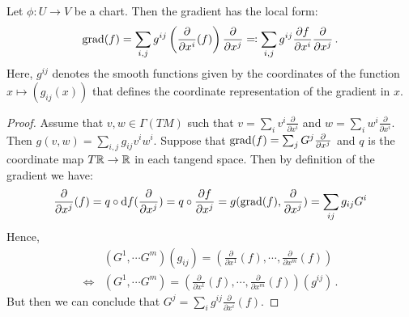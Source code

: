 \begin{lemma}
	Let $\phi:U\to V$ be a chart. Then the gradient has the local form:
	\begin{align*}
		\mathrm{grad}(f) =\sum_{i,j}g^{ij}  \left( \frac{\partial }{\partial x^i} (f) \right) \frac{\partial }{\partial x^j} \eqcolon \sum_{i,j}g^{ij} \frac{\partial f}{\partial x^i}  \frac{\partial }{\partial x^j} \, .
	\end{align*}
	Here, $g^{ij}$ denotes the smooth functions given by the coordinates of the function $x\mapsto (g_{ij}(x))$ that defines the coordinate representation of the gradient in $x$. 
\end{lemma}
\begin{proof} Assume that $v,w\in \Gamma( TM)$ such that $v=\sum_i v^i\frac{\partial	}{\partial x^i}$ and $w=\sum_i w^i\frac{\partial	}{\partial x^i}$. Then  $g(v,w)=\sum_{i,j} g_{ij} v^i w^i$.
	Suppose that $\mathrm{grad}(f)=\sum_j G^j \frac{\partial}{\partial x^j}$ and $q$ is the coordinate map $T\mathbb{R}\to \mathbb{R}$ in each tangend space. Then by definition of the gradient we have:
	\begin{align*}
		\frac{\partial }{\partial x^j}(f)=	q \circ \mathop{}\!\mathrm{d} f (\frac{\partial }{\partial x^j})=q\circ \frac{\partial f}{\partial x^j}= g(\mathrm{grad}(f),\frac{\partial }{\partial x^j})= \sum_{ij}g_{ij} G^i
	\end{align*} Hence, 
	\begin{align*}
		&(G^1,\cdots G^m)(g_{ij})=\left(\frac{\partial }{\partial x^1} (f),\cdots,\frac{\partial }{\partial x^m} (f)  \right) \\
		\Leftrightarrow &(G^1,\cdots G^m)=\left(\frac{\partial }{\partial x^1} (f),\cdots,\frac{\partial }{\partial x^m} (f)  \right) (g^{ij})\, .
	\end{align*}  But then we can conclude that $G^j=\sum_i g^{ij}\frac{\partial }{\partial x^i} (f)$.
	
\end{proof}
